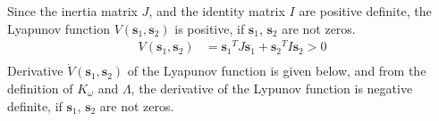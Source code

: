 Since the inertia matrix \(J\), and the identity matrix \( I\) are positive definite, the Lyapunov function \(V({\boldsymbol s}_1, {\boldsymbol s}_2) \) is positive, if \({\boldsymbol s}_1\), \({\boldsymbol s}_2\) are not zeros.
\begin{equation}
\begin{aligned}
V({\boldsymbol s}_1, {\boldsymbol s}_2) & =  {{\boldsymbol s}_1}^{T} J {\boldsymbol s}_1 + {{\boldsymbol s}_2}^{T} I {\boldsymbol s}_2  > 0 \\
\end{aligned} 
\end{equation}
Derivative \({\dot{V}({\boldsymbol s}_1, {\boldsymbol s}_2)}\) of the Lyapunov function is given below, and from the definition of \(K_{\omega}\) and \(\Lambda\), the derivative of the Lypunov function is negative definite, if \({\boldsymbol s}_1\), \({\boldsymbol s}_2\) are not zeros. \\ 
